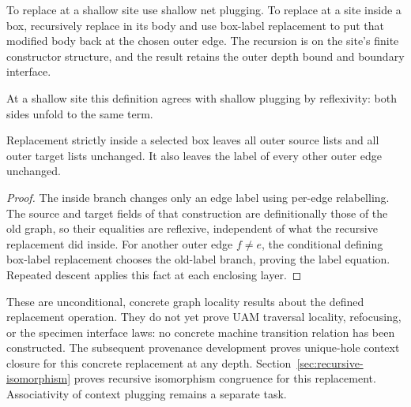 \begin{definition}\label{term:deep-plugging}
To replace at a shallow site use shallow net plugging. To replace at a site
inside a box, recursively replace in its body and use box-label replacement to
put that modified body back at the chosen outer edge. The recursion is on the
site's finite constructor structure, and the result retains the outer depth
bound and boundary interface.
\end{definition}
At a shallow site this definition agrees with shallow plugging by reflexivity:
both sides unfold to the same term.

\begin{theorem}
Replacement strictly inside a selected box leaves all outer source lists and
all outer target lists unchanged. It also leaves the label of every other outer
edge unchanged.
\end{theorem}
\begin{proof}
The inside branch changes only an edge label using per-edge relabelling. The
source and target fields of that construction are definitionally those of the
old graph, so their equalities are reflexive, independent of what the recursive
replacement did inside. For another outer edge $f\ne e$, the conditional defining
box-label replacement chooses the old-label branch, proving the label equation.
Repeated descent applies this fact at each enclosing layer.
\end{proof}
These are unconditional, concrete graph locality results about the defined
replacement operation. They do not yet prove UAM traversal locality, refocusing,
or the specimen interface laws: no concrete machine transition relation has
been constructed. The subsequent provenance development proves unique-hole context closure for
this concrete replacement at any depth. Section~\ref{sec:recursive-isomorphism}
proves recursive isomorphism congruence for this replacement. Associativity of
context plugging remains a separate task.
